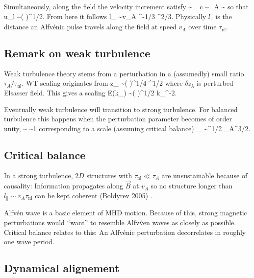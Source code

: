 \documentclass[usenatbib,twocolumn]{aastex63}
\begin{document}
Simultaneously, along the field the velocity increment satisfy
\be
{} \sim \epsilon \quad{}\quad
\tau_c \sim \tau_A \sim {}
\ee
so that
\be
\delta u_{l \parallel} \sim \left(  \right)^{1/2}.
\ee
From here it follows
\be
l_{\parallel} \sim v_A \epsilon^{-1/3} \lambda^{2/3}.
\ee
Physically $l_{\parallel}$ is the distance an Alfv\'enic pulse travels along the field at speed $v_A$ over time $\tau_{\mathrm{nl}}$.


\subsection{Remark on weak turbulence}


Weak turbulence theory stems from a perturbation in a (assumedly) small ratio $\tau_A/\tau_{\mathrm{nl}}$.
WT scaling originates from
\be
\delta z_{\lambda} \sim \left(  \right)^{1/4} \lambda^{1/2}
\ee
where $\delta z_{\lambda}$ is perturbed Elsasser field.
This gives a scaling
\be
E(k_{\perp}) \sim \left(  \right)^{1/2} k_{\perp}^{-2}.
\ee

Eventually weak turbulence will transition to strong turbulence.
For balanced turbulence this happens when the perturbation parameter becomes of order unity,
\be
{} \sim {} \sim 1
\ee
corresponding to a scale (assuming critical balance)
\be
\lambda_{} \sim \epsilon^{1/2} \tau_A^{3/2}.
\ee


\subsection{Critical balance}

In a strong turbulence, $2D$ structures with $\tau_{\mathrm{nl}} \ll \tau_A$ are unsustainable because of causality:
Information propagates along $\vec{B}$ at $v_A$ so no structure longer than $l_{\parallel} \sim v_A \tau_{\mathrm{nl}}$ can be kept coherent (Boldyrev 2005) \citep{Boldyrev_2005}.


Alfv\'en wave is a basic element of MHD motion.
Because of this, strong magnetic perturbations would ``want'' to resemble Alfv\'ven waves as closely as possible.
Critical balance relates to this:
An Alfv\'enic perturbation decorrelates in roughly one wave period.

\subsection{Dynamical alignement}
\end{document}
